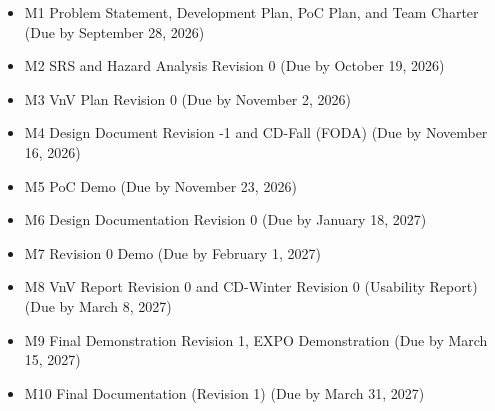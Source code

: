 \begin{itemize}
	\item M1 Problem Statement, Development Plan, PoC Plan, and Team Charter 
	(Due by September 28, 2026)
	\item M2 SRS and Hazard Analysis Revision 0 (Due by October 19, 2026)
	\item M3 VnV Plan Revision 0 (Due by November 2, 2026)
	\item M4 Design Document Revision -1 and CD-Fall (FODA) (Due by November 
	16, 2026)
	\item M5 PoC Demo (Due by November 23, 2026)
	\item M6 Design Documentation Revision 0 (Due by January 18, 2027)
	\item M7 Revision 0 Demo (Due by February 1, 2027)
	\item M8 VnV Report Revision 0 and CD-Winter Revision 0 (Usability Report) 
	(Due by March 8, 2027)
	\item M9 Final Demonstration Revision 1, EXPO Demonstration (Due by March 
	15, 2027)
	\item M10 Final Documentation (Revision 1) (Due by March 31, 2027)
\end{itemize}